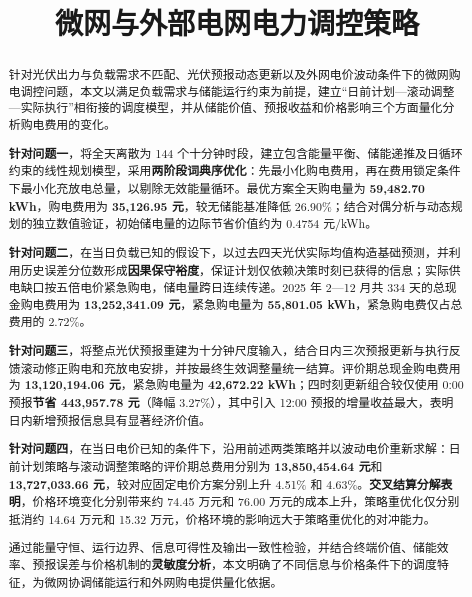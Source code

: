 \documentclass[withoutpreface,bwprint]{cumcmthesis}
\title{微网与外部电网电力调控策略}
\begin{document}
\maketitle

\begin{abstract}
\setlength{\parskip}{0pt}
针对光伏出力与负载需求不匹配、光伏预报动态更新以及外网电价波动条件下的微网购电调控问题，本文以满足负载需求与储能运行约束为前提，建立``日前计划---滚动调整---实际执行''相衔接的调度模型，并从储能价值、预报收益和价格影响三个方面量化分析购电费用的变化。

\textbf{针对问题一}，将全天离散为 144 个十分钟时段，建立包含能量平衡、储能递推及日循环约束的线性规划模型，采用\textbf{两阶段词典序优化}：先最小化购电费用，再在费用锁定条件下最小化充放电总量，以剔除无效能量循环。最优方案全天购电量为 \textbf{59,482.70 kWh}，购电费用为 \textbf{35,126.95 元}，较无储能基准降低 26.90\%；结合对偶分析与动态规划的独立数值验证，初始储电量的边际节省价值约为 0.4754 元/kWh。

\textbf{针对问题二}，在当日负载已知的假设下，以过去四天光伏实际均值构造基础预测，并利用历史误差分位数形成\textbf{因果保守裕度}，保证计划仅依赖决策时刻已获得的信息；实际供电缺口按五倍电价紧急购电，储电量跨日连续传递。2025 年 2---12 月共 334 天的总现金购电费用为 \textbf{13,252,341.09 元}，紧急购电量为 \textbf{55,801.05 kWh}，紧急购电费仅占总费用的 2.72\%。

\textbf{针对问题三}，将整点光伏预报重建为十分钟尺度输入，结合日内三次预报更新与执行反馈滚动修正购电和充放电安排，并按最终生效调整量统一结算。评价期总现金购电费用为 \textbf{13,120,194.06 元}，紧急购电量为 \textbf{42,672.22 kWh}；四时刻更新组合较仅使用 0:00 预报\textbf{节省 443,957.78 元}（降幅 3.27\%），其中引入 12:00 预报的增量收益最大，表明日内新增预报信息具有显著经济价值。

\textbf{针对问题四}，在当日电价已知的条件下，沿用前述两类策略并以波动电价重新求解：日前计划策略与滚动调整策略的评价期总费用分别为 \textbf{13,850,454.64 元}和 \textbf{13,727,033.66 元}，较对应固定电价方案分别上升 4.51\% 和 4.63\%。\textbf{交叉结算分解表明}，价格环境变化分别带来约 74.45 万元和 76.00 万元的成本上升，策略重优化仅分别抵消约 14.64 万元和 15.32 万元，价格环境的影响远大于策略重优化的对冲能力。

通过能量守恒、运行边界、信息可得性及输出一致性检验，并结合终端价值、储能效率、预报误差与价格机制的\textbf{灵敏度分析}，本文明确了不同信息与价格条件下的调度特征，为微网协调储能运行和外网购电提供量化依据。

\end{abstract}
\clearpage
\end{document}
